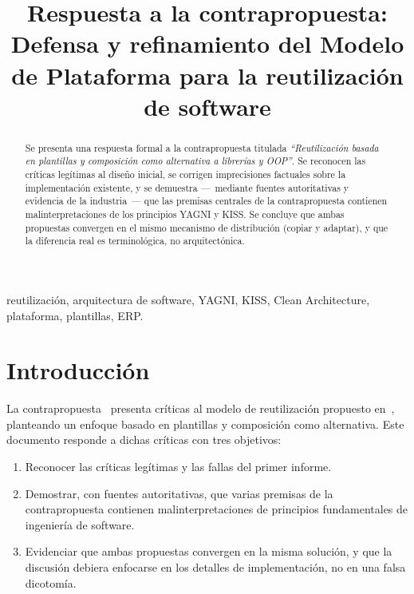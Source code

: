 \documentclass[conference]{IEEEtran}
\title{Respuesta a la contrapropuesta: Defensa y refinamiento del Modelo de Plataforma para la reutilizaci\'on de software}
\author{
  \IEEEauthorblockN{Gonzalo Enrique Guti\'errez Castillo}
  \IEEEauthorblockA{\'Area de Digitales -- ACIDE\\
  Arequipa, Per\'u\\
  gonzalog@acideperu.org\\
  gonzalogut.99@gmail.com}
}
\begin{document}
\maketitle

\begin{abstract}
Se presenta una respuesta formal a la contrapropuesta titulada
\textit{``Reutilizaci\'on basada en plantillas y composici\'on como
alternativa a librer\'ias y OOP''}. Se reconocen las cr\'iticas
leg\'itimas al dise\~no inicial, se corrigen imprecisiones
factuales sobre la implementaci\'on existente, y se demuestra
---~mediante fuentes autoritativas y evidencia de la industria~---
que las premisas centrales de la contrapropuesta contienen
malinterpretaciones de los principios YAGNI y KISS. Se concluye
que ambas propuestas convergen en el mismo mecanismo de
distribuci\'on (copiar y adaptar), y que la diferencia real es
terminol\'ogica, no arquitect\'onica.
\end{abstract}

\begin{IEEEkeywords}
reutilizaci\'on, arquitectura de software, YAGNI, KISS, Clean
Architecture, plataforma, plantillas, ERP.
\end{IEEEkeywords}

\section{Introducci\'on}

La contrapropuesta~\cite{araoz2026} presenta cr\'iticas al modelo
de reutilizaci\'on propuesto en~\cite{gutierrez2026}, planteando un
enfoque basado en plantillas y composici\'on como alternativa.
Este documento responde a dichas cr\'iticas con tres objetivos:

\begin{enumerate}
  \item Reconocer las cr\'iticas leg\'itimas y las fallas del
    primer informe.
  \item Demostrar, con fuentes autoritativas, que varias premisas
    de la contrapropuesta contienen malinterpretaciones de
    principios fundamentales de ingenier\'ia de software.
  \item Evidenciar que ambas propuestas convergen en la misma
    soluci\'on, y que la discusi\'on debiera enfocarse en los
    detalles de implementaci\'on, no en una falsa dicotom\'ia.
\end{enumerate}
\end{document}
